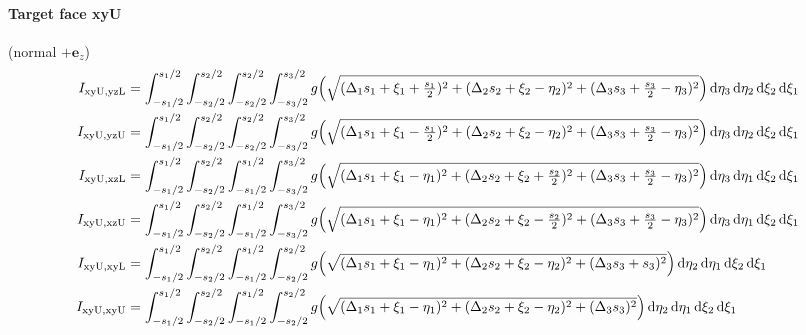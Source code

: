 \paragraph{Target face xyU} (normal $+\mathbf{e}_z$)
\begin{align*}
I_{\mathrm{xyU},\mathrm{yzL}} &= \int_{-s_1/2}^{s_1/2}\int_{-s_2/2}^{s_2/2}\int_{-s_2/2}^{s_2/2}\int_{-s_3/2}^{s_3/2} g\Bigl(\sqrt{(\Delta_1 s_1 + \xi_1 + \tfrac{s_1}{2})^2 + (\Delta_2 s_2 + \xi_2 - \eta_2)^2 + (\Delta_3 s_3 + \tfrac{s_3}{2} - \eta_3)^2}\Bigr)\,\mathrm{d}\eta_3\,\mathrm{d}\eta_2\,\mathrm{d}\xi_2\,\mathrm{d}\xi_1 \\I_{\mathrm{xyU},\mathrm{yzU}} &= \int_{-s_1/2}^{s_1/2}\int_{-s_2/2}^{s_2/2}\int_{-s_2/2}^{s_2/2}\int_{-s_3/2}^{s_3/2} g\Bigl(\sqrt{(\Delta_1 s_1 + \xi_1 - \tfrac{s_1}{2})^2 + (\Delta_2 s_2 + \xi_2 - \eta_2)^2 + (\Delta_3 s_3 + \tfrac{s_3}{2} - \eta_3)^2}\Bigr)\,\mathrm{d}\eta_3\,\mathrm{d}\eta_2\,\mathrm{d}\xi_2\,\mathrm{d}\xi_1 \\I_{\mathrm{xyU},\mathrm{xzL}} &= \int_{-s_1/2}^{s_1/2}\int_{-s_2/2}^{s_2/2}\int_{-s_1/2}^{s_1/2}\int_{-s_3/2}^{s_3/2} g\Bigl(\sqrt{(\Delta_1 s_1 + \xi_1 - \eta_1)^2 + (\Delta_2 s_2 + \xi_2 + \tfrac{s_2}{2})^2 + (\Delta_3 s_3 + \tfrac{s_3}{2} - \eta_3)^2}\Bigr)\,\mathrm{d}\eta_3\,\mathrm{d}\eta_1\,\mathrm{d}\xi_2\,\mathrm{d}\xi_1 \\I_{\mathrm{xyU},\mathrm{xzU}} &= \int_{-s_1/2}^{s_1/2}\int_{-s_2/2}^{s_2/2}\int_{-s_1/2}^{s_1/2}\int_{-s_3/2}^{s_3/2} g\Bigl(\sqrt{(\Delta_1 s_1 + \xi_1 - \eta_1)^2 + (\Delta_2 s_2 + \xi_2 - \tfrac{s_2}{2})^2 + (\Delta_3 s_3 + \tfrac{s_3}{2} - \eta_3)^2}\Bigr)\,\mathrm{d}\eta_3\,\mathrm{d}\eta_1\,\mathrm{d}\xi_2\,\mathrm{d}\xi_1 \\I_{\mathrm{xyU},\mathrm{xyL}} &= \int_{-s_1/2}^{s_1/2}\int_{-s_2/2}^{s_2/2}\int_{-s_1/2}^{s_1/2}\int_{-s_2/2}^{s_2/2} g\Bigl(\sqrt{(\Delta_1 s_1 + \xi_1 - \eta_1)^2 + (\Delta_2 s_2 + \xi_2 - \eta_2)^2 + (\Delta_3 s_3 + s_3)^2}\Bigr)\,\mathrm{d}\eta_2\,\mathrm{d}\eta_1\,\mathrm{d}\xi_2\,\mathrm{d}\xi_1 \\I_{\mathrm{xyU},\mathrm{xyU}} &= \int_{-s_1/2}^{s_1/2}\int_{-s_2/2}^{s_2/2}\int_{-s_1/2}^{s_1/2}\int_{-s_2/2}^{s_2/2} g\Bigl(\sqrt{(\Delta_1 s_1 + \xi_1 - \eta_1)^2 + (\Delta_2 s_2 + \xi_2 - \eta_2)^2 + (\Delta_3 s_3)^2}\Bigr)\,\mathrm{d}\eta_2\,\mathrm{d}\eta_1\,\mathrm{d}\xi_2\,\mathrm{d}\xi_1
\end{align*}